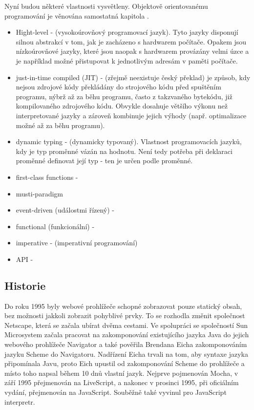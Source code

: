 \documentclass[main.tex]{subfiles}
\begin{document}
Nyní budou některé vlastnosti vysvětleny. Objektově orientovanému programování je věnována samostatná kapitola .
\begin{itemize}
    \item Hight-level - (vysokoúrovňový programovací jazyk). Tyto jazyky disponují silnou abstrakcí v tom, jak je zacházeno s hardwarem počítače. Opakem jsou nízkoúrovňové jazyky, které jsou naopak s hardwarem provázány velmi úzce a je například možné přistupovat k jednotlivým adresám v paměti počítače.
    \item just-in-time compiled (JIT) - (zřejmě neexistuje český překlad) je způsob, kdy nejsou zdrojové kódy překládány do strojového kódu před spuštěním programu, nýbrž až za běhu programu, často z takzvaného bytekódu, již kompilovaného zdrojového kódu. Obvykle dosahuje většího výkonu než interpretované jazyky a zároveň kombinuje jejich výhody (např. optimalizace možné až za běhu programu).
    \item dynamic typing - (dynamicky typovaný). Vlastnost programovacích jazyků, kdy je typ proměnné vázán na hodnotu. Není tedy potřeba při deklaraci proměnné definovat její typ - ten je určen podle proměnné.
    \item first-class functions - 

    \item musti-paradigm

    \item event-driven (událostmi řízený) - 
    \item functional (funkcionální) - 
    \item imperative - (imperativní programování) 
    \item API - 
\end{itemize}

\subsection{Historie}
Do roku 1995 byly webové prohlížeče schopné zobrazovat pouze statický obsah, bez možnosti jakkoli zobrazit pohyblivé prvky. To se rozhodla změnit společnost Netscape, která se začala ubírat dvěma cestami. Ve spolupráci se společností Sun Microsystem začala pracovat na zakomponování existujícího jazyka Java do jejich webového prohlížeče Navigator a také pověřila Brendana Eicha zakomponováním jazyku Scheme do Navigatoru. Nadřízení Eicha trvali na tom, aby syntaxe jazyka připomínala Javu, proto Eich upustil od zakomponování Scheme do prohlížeče a místo toho napsal během 10 dnů vlastní jazyk. Nejprve pojmenován Mocha, v září 1995 přejmenován na LiveScript, a nakonec v prosinci 1995, při oficiálním vydání, přejmenován na JavaScript. Souběžně také vyvinul pro JavaScript interpretr.
\end{document}
